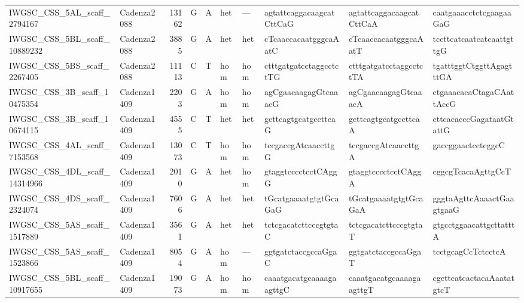 \begin{tabular}{llrlllllll}
 IWGSC\_CSS\_5AL\_scaff\_2794167  & Cadenza2088 &      13162 & G         & A        & het            & ---         & agtattcaggacaagcatCttCaG  & agtattcaggacaagcatCttCaA  & caatgaaacctctcgaagaaGaG   \\
 IWGSC\_CSS\_5BL\_scaff\_10889232 & Cadenza2088 &       3885 & G         & A        & het            & het         & cTcaaccacaatgggcaAatC     & cTcaaccacaatgggcaAatT     & tccttcatcaatcatcaattgttgG \\
 IWGSC\_CSS\_5BS\_scaff\_2267405  & Cadenza2088 &      11113 & C         & T        & hom            & hom         & ctttgatgatcctaggcctctTG   & ctttgatgatcctaggcctctTA   & tgatttggtCtggttAgagtttGA  \\
 IWGSC\_CSS\_3B\_scaff\_10475354  & Cadenza1409 &       2203 & G         & A        & hom            & hom         & agCgaacaagagGtcaaacG      & agCgaacaagagGtcaaacA      & ctgaaacacaCtagaCAattAccG  \\
 IWGSC\_CSS\_3B\_scaff\_10674115  & Cadenza1409 &       4555 & C         & T        & het            & het         & gcttcagtgcatgccttcaG      & gcttcagtgcatgccttcaA      & cttcacacccGagataatGtattG  \\
 IWGSC\_CSS\_4AL\_scaff\_7153568  & Cadenza1409 &      13073 & C         & T        & hom            & hom         & tccgaccgAtcaaccttgG       & tccgaccgAtcaaccttgA       & gaccggaactcctcggcC        \\
 IWGSC\_CSS\_4DL\_scaff\_14314966 & Cadenza1409 &       2010 & G         & A        & het            & hom         & gtaggtcccctcctCAggG       & gtaggtcccctcctCAggA       & cggcgTcacaAgttgCcT        \\
 IWGSC\_CSS\_4DS\_scaff\_2324074  & Cadenza1409 &       7606 & G         & A        & het            & het         & tGcatgaaaatgtgtGcaGaG     & tGcatgaaaatgtgtGcaGaA     & gggtaAgttcAaaactGaagtgaaG \\
 IWGSC\_CSS\_5AS\_scaff\_1517889  & Cadenza1409 &       3561 & G         & A        & het            & het         & tctcgacatcttcccgtgtaC     & tctcgacatcttcccgtgtaT     & gtgcctggaacattgcttatttA   \\
 IWGSC\_CSS\_5AS\_scaff\_1523866  & Cadenza1409 &       8054 & G         & A        & hom            & ---         & ggtgatctaccgccaGgaC       & ggtgatctaccgccaGgaT       & tcctgcagCcTctcctcA        \\
 IWGSC\_CSS\_5BL\_scaff\_10917655 & Cadenza1409 &      19073 & G         & A        & hom            & hom         & caaatgacatgcaaaagaagttgC  & caaatgacatgcaaaagaagttgT  & cgcttcatcactacaAaatatgtcT \\

\end{tabular}
